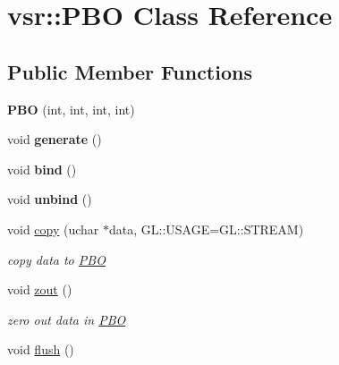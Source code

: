 \hypertarget{classvsr_1_1_p_b_o}{\section{vsr\-:\-:P\-B\-O Class Reference}
\label{classvsr_1_1_p_b_o}
}
\subsection*{Public Member Functions}
\begin{DoxyCompactItemize}
\item 
\hypertarget{classvsr_1_1_p_b_o_ac25e518f6235158b16391b2476161680}{{\bfseries P\-B\-O} (int, int, int, int)}\label{classvsr_1_1_p_b_o_ac25e518f6235158b16391b2476161680}

\item 
\hypertarget{classvsr_1_1_p_b_o_a1e67c7b29ff6d458b622794f2f9a8ccd}{void {\bfseries generate} ()}\label{classvsr_1_1_p_b_o_a1e67c7b29ff6d458b622794f2f9a8ccd}

\item 
\hypertarget{classvsr_1_1_p_b_o_a8e352410f75c08e49acdc93308ee1834}{void {\bfseries bind} ()}\label{classvsr_1_1_p_b_o_a8e352410f75c08e49acdc93308ee1834}

\item 
\hypertarget{classvsr_1_1_p_b_o_adfb64d2e7622fc6b674d078f0a1a7263}{void {\bfseries unbind} ()}\label{classvsr_1_1_p_b_o_adfb64d2e7622fc6b674d078f0a1a7263}

\item 
\hypertarget{classvsr_1_1_p_b_o_a02579d5177dbd0d49d11df8da7aa0d5e}{void \hyperlink{classvsr_1_1_p_b_o_a02579d5177dbd0d49d11df8da7aa0d5e}{copy} (uchar $\ast$data, G\-L\-::\-U\-S\-A\-G\-E=G\-L\-::\-S\-T\-R\-E\-A\-M)}\label{classvsr_1_1_p_b_o_a02579d5177dbd0d49d11df8da7aa0d5e}

\begin{DoxyCompactList}\small\item\em copy data to \hyperlink{classvsr_1_1_p_b_o}{P\-B\-O} \end{DoxyCompactList}\item 
\hypertarget{classvsr_1_1_p_b_o_a39b1ef2ac7dbe7ad36690bbbeb43fb9c}{void \hyperlink{classvsr_1_1_p_b_o_a39b1ef2ac7dbe7ad36690bbbeb43fb9c}{zout} ()}\label{classvsr_1_1_p_b_o_a39b1ef2ac7dbe7ad36690bbbeb43fb9c}

\begin{DoxyCompactList}\small\item\em zero out data in \hyperlink{classvsr_1_1_p_b_o}{P\-B\-O} \end{DoxyCompactList}\item 
\hypertarget{classvsr_1_1_p_b_o_a7d9cf6f8a105fc5b0374af375a7ac89f}{void \hyperlink{classvsr_1_1_p_b_o_a7d9cf6f8a105fc5b0374af375a7ac89f}{flush} ()}\label{classvsr_1_1_p_b_o_a7d9cf6f8a105fc5b0374af375a7ac89f}


\end{DoxyCompactItemize}
